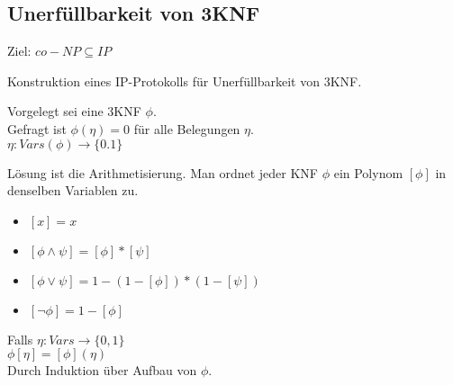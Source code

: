 















\subsection{Unerfüllbarkeit von 3KNF}
\label{sec:unerfullbarkeit_von_3knf}


Ziel: $\mathit{co-NP} \subseteq \mathit{IP}$

Konstruktion eines IP-Protokolls für Unerfüllbarkeit von 3KNF.

Vorgelegt sei eine 3KNF $\phi$.
\\
Gefragt ist $\phi(\eta) = 0$ für alle Belegungen $\eta$.
\\
$\eta: Vars(\phi) \rightarrow \{0.1\}$


Lösung ist die Arithmetisierung.
Man ordnet jeder KNF $\phi$ ein Polynom $[\phi]$ in denselben Variablen zu.
\begin{itemize}
    \item $[ x ] = x$
    \item $[ \phi \land \psi ] =  [\phi] * [\psi]$
    \item $[ \phi \lor \psi ] =  1 - (1 - [\phi]) * (1 - [\psi])$
    \item $[ \neg \phi ] =  1 - [\phi]$
\end{itemize}

Falls $\eta: Vars \rightarrow \{0,1\}$ \\
$\phi [\eta] = [\phi](\eta)$ \\
Durch Induktion über Aufbau von $\phi$.

